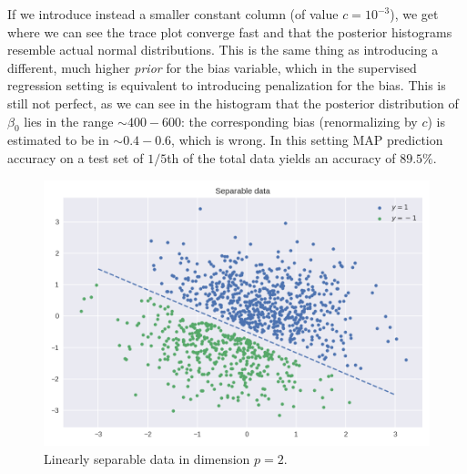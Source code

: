 \documentclass[11pt]{article}
\begin{document}
If we introduce instead a smaller constant column (of value $c = 10^{-3}$), we get  where we can see the trace plot converge fast and that the posterior histograms resemble actual normal distributions.
This is the same thing as introducing a different, much higher \textit{prior} for the bias variable, which in the supervised regression setting is equivalent to introducing penalization for the bias. This is still not perfect, as we can see in the histogram that the posterior distribution of $\beta_0$ lies in the range $\sim 400-600$: the corresponding bias (renormalizing by $c$) is estimated to be in $\sim 0.4-0.6$, which is wrong. In this setting MAP prediction accuracy on a test set of $1/5$th of the total data yields an accuracy of $89.5\%$.


\begin{figure}[h]
	\centering
	\includegraphics[width=.66\linewidth]{images/separable_data.png}
	\caption{Linearly separable data in dimension $p=2$.}\label{fig:CompleteSeparDataset}
\end{figure}
\end{document}
